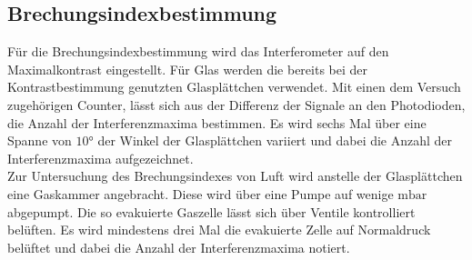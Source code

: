 \subsection{Brechungsindexbestimmung}
Für die Brechungsindexbestimmung wird das Interferometer auf den Maximalkontrast eingestellt. Für Glas werden die bereits bei der Kontrastbestimmung genutzten Glasplättchen verwendet.
Mit einen dem Versuch zugehörigen Counter, lässt sich aus der Differenz der Signale an den Photodioden, die Anzahl der Interferenzmaxima bestimmen. Es wird sechs Mal über eine Spanne von $10°$ der Winkel der Glasplättchen
variiert und dabei die Anzahl der Interferenzmaxima aufgezeichnet.\\
Zur Untersuchung des Brechungsindexes von Luft wird anstelle der Glasplättchen eine Gaskammer angebracht. Diese wird über eine Pumpe auf wenige $\si{\milli\bar}$ abgepumpt. Die so evakuierte Gaszelle lässt sich
über Ventile kontrolliert belüften. Es wird mindestens drei Mal die evakuierte Zelle auf Normaldruck belüftet und dabei die Anzahl der Interferenzmaxima notiert.
